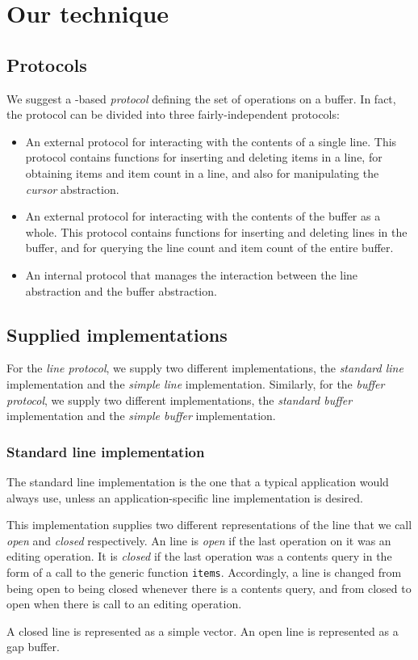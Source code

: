 \section{Our technique}

\subsection{Protocols}

We suggest a \clos{}-based \emph{protocol} defining the set of
operations on a buffer.  In fact, the protocol can be divided into
three fairly-independent protocols:

\begin{itemize}
\item An external protocol for interacting with the contents of a
  single line.  This protocol contains functions for inserting and
  deleting items in a line, for obtaining items and item count in a
  line, and also for manipulating the \emph{cursor} abstraction.
\item An external protocol for interacting with the contents of the
  buffer as a whole.  This protocol contains functions for inserting
  and deleting lines in the buffer, and for querying the line count
  and item count of the entire buffer.
\item An internal protocol that manages the interaction between the
  line abstraction and the buffer abstraction.
\end{itemize}

\subsection{Supplied implementations}

For the \emph{line protocol}, we supply two different implementations,
the \emph{standard line} implementation and the \emph{simple line}
implementation.  Similarly, for the \emph{buffer protocol}, we supply
two different implementations, the \emph{standard buffer} implementation
and the \emph{simple buffer} implementation.

\subsubsection{Standard line implementation}

The standard line implementation is the one that a typical application
would always use, unless an application-specific line implementation
is desired.

This implementation supplies two different representations of the line
that we call \emph{open} and \emph{closed} respectively.  An line is
\emph{open} if the last operation on it was an editing operation.  It
is \emph{closed} if the last operation was a contents query in the
form of a call to the generic function \texttt{items}.  Accordingly, a
line is changed from being open to being closed whenever there is a
contents query, and from closed to open when there is call to an
editing operation.

A closed line is represented as a \commonlisp{} simple vector.  An
open line is represented as a gap buffer. 

